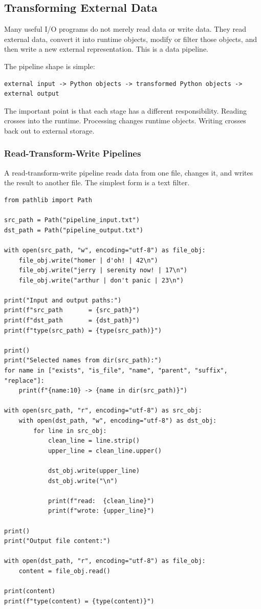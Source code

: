 \subsection{Transforming External Data}

Many useful I/O programs do not merely read data or write data. They read external data, convert it into runtime objects, modify or filter those objects, and then write a new external representation. This is a data pipeline.

The pipeline shape is simple:

\begin{verbatim}
external input -> Python objects -> transformed Python objects -> external output
\end{verbatim}

The important point is that each stage has a different responsibility. Reading crosses into the runtime. Processing changes runtime objects. Writing crosses back out to external storage.

\subsubsection{Read-Transform-Write Pipelines}

A read-transform-write pipeline reads data from one file, changes it, and writes the result to another file. The simplest form is a text filter.

\begin{verbatim}
from pathlib import Path

src_path = Path("pipeline_input.txt")
dst_path = Path("pipeline_output.txt")

with open(src_path, "w", encoding="utf-8") as file_obj:
    file_obj.write("homer | d'oh! | 42\n")
    file_obj.write("jerry | serenity now! | 17\n")
    file_obj.write("arthur | don't panic | 23\n")

print("Input and output paths:")
print(f"src_path       = {src_path}")
print(f"dst_path       = {dst_path}")
print(f"type(src_path) = {type(src_path)}")

print()
print("Selected names from dir(src_path):")
for name in ["exists", "is_file", "name", "parent", "suffix", "replace"]:
    print(f"{name:10} -> {name in dir(src_path)}")

with open(src_path, "r", encoding="utf-8") as src_obj:
    with open(dst_path, "w", encoding="utf-8") as dst_obj:
        for line in src_obj:
            clean_line = line.strip()
            upper_line = clean_line.upper()

            dst_obj.write(upper_line)
            dst_obj.write("\n")

            print(f"read:  {clean_line}")
            print(f"wrote: {upper_line}")

print()
print("Output file content:")

with open(dst_path, "r", encoding="utf-8") as file_obj:
    content = file_obj.read()

print(content)
print(f"type(content) = {type(content)}")
\end{verbatim}

